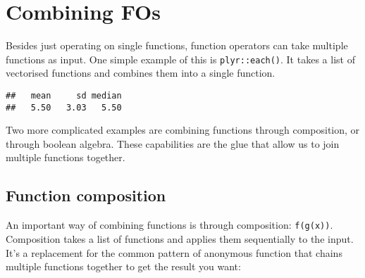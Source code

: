 \hypertarget{combining-fos}{%
\section{Combining FOs}\label{combining-fos}}

Besides just operating on single functions, function operators can take
multiple functions as input. One simple example of this is
\texttt{plyr::each()}. It takes a list of vectorised functions and
combines them into a single function. 

\begin{Shaded}
\begin{Highlighting}[]
\StringTok{ }\OperatorTok{::}
\NormalTok{(}\OperatorTok{:}\NormalTok{)}
\end{Highlighting}
\end{Shaded}

\begin{verbatim}
##   mean     sd median 
##   5.50   3.03   5.50
\end{verbatim}

Two more complicated examples are combining functions through
composition, or through boolean algebra. These capabilities are the glue
that allow us to join multiple functions together.

\hypertarget{function-composition}{%
\subsection{Function composition}\label{function-composition}}

An important way of combining functions is through composition:
\texttt{f(g(x))}. Composition takes a list of functions and applies them
sequentially to the input. It's a replacement for the common pattern of
anonymous function that chains multiple functions together to get the
result you want:  

\begin{Shaded}
\begin{Highlighting}[]
\NormalTok{(}
\end{Highlighting}
\end{Shaded}

